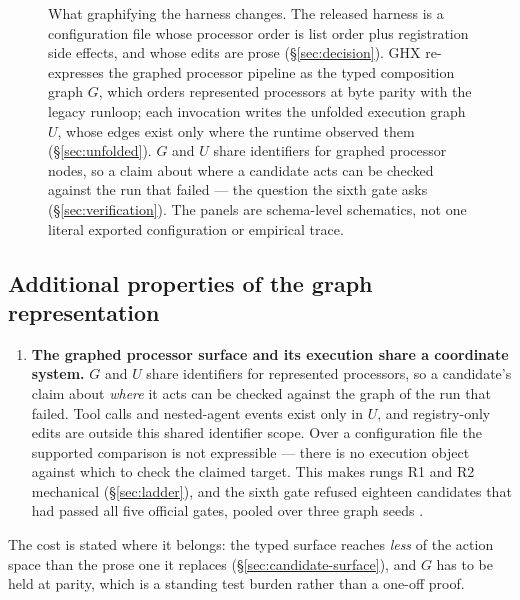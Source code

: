 \begin{figure}[htbp]
\centering
\resizebox{\textwidth}{!}{}
\caption[The harness, graphified]{What graphifying the harness changes.
The released harness is a configuration file whose processor order is list
order plus registration side effects, and whose edits are prose
(\S\ref{sec:decision}). GHX re-expresses the graphed processor pipeline as the
typed composition graph $G$, which orders represented processors at byte
parity with the legacy runloop; each invocation writes the unfolded
execution graph $U$, whose edges exist only where the runtime observed them
(\S\ref{sec:unfolded}). $G$ and $U$ share identifiers for graphed
processor nodes, so a claim about where a candidate acts can be checked
against the run that failed ---
the question the sixth gate asks (\S\ref{sec:verification}). The panels
are schema-level schematics, not one literal exported configuration or
empirical trace.}
\label{fig:harness-graph}
\end{figure}

\subsection*{Additional properties of the graph representation}


\begin{enumerate}
  \item \textbf{The graphed processor surface and its execution share
        a coordinate system.} $G$ and $U$ share identifiers for represented
        processors, so a candidate's claim about \emph{where} it acts can be
        checked against the graph of the run that failed. Tool calls and
        nested-agent events exist only in $U$, and registry-only edits are
        outside this shared identifier scope. Over a configuration file the
        supported comparison is not expressible --- there is no execution
        object against which to check the claimed target. This makes rungs
        R1 and R2 mechanical (\S\ref{sec:ladder}), and the sixth gate refused
        eighteen candidates that had passed all five official gates, pooled over
        three graph seeds .
\end{enumerate}

The cost is stated where it belongs: the typed surface reaches
\emph{less} of the action space than the prose one it replaces
(\S\ref{sec:candidate-surface}), and $G$ has to be held at parity, which
is a standing test burden rather than a one-off proof.

